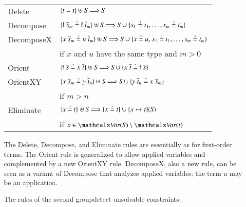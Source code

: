 \jot
\noindent
\begin{tabular}{ll}
  \textsf{Delete} & $\{ t \unif t \} \uplus \mathit{S} \Unifarrow \mathit{S}$ \\[\jot]
  \textsf{Decompose} & $\{ \cst{f} \; \tuple{s}{m} \unif \cst{f} \; \tuple{t}{m} \} \uplus \mathit{S} \Unifarrow {} 
                        \mathit{S} \cup \{ s_1 \unif t_1, \ldots, s_m \unif t_m \}$ \\[\jot]
  \textsf{DecomposeX} & $\{ x \; \tuple{s}{{m}} \unif u \; \tuple{t}{{m}} \} \uplus \mathit{S} \Unifarrow {} 
                         \mathit{S} \cup \{ x \unif u{,}\; s_1 \unif t_1, \ldots, s_{m} \unif t_{m} \}$  \\
                      & if $x$ and $u$ have the same type and $m > 0$ \\[\jot]
  \textsf{Orient}     & $\{ \cst{f} \; \overline{s} \unif x \; \overline{t} \} \allowbreak \uplus \mathit{S}
                         \Unifarrow \mathit{S} \cup \{ x \; \overline{t} \unif \cst{f} \; \overline{s} \}$ \\[\jot]
  \textsf{OrientXY}   &  $\{ x \; \tuple{s}{m} \unif y \; \tuple{t}{n} \} \allowbreak \uplus \mathit{S}
                         \Unifarrow \mathit{S} \cup \{ y \; \tuple{t}{n} \unif x \; \tuple{s}{m} \}$  \\
                      &   if $m > n$ \\[\jot]
  \textsf{Eliminate}  & $\{ x \unif t \} \uplus \mathit{S} \Unifarrow \{ x \unif t \} \cup \{ x \mapsto t \}(\mathit{S})$ \\
                      &   if $x \in \Var(\mathit{S}) \setminus \Var(t)$
\end{tabular}
\jot

The \textsf{Delete}, \textsf{Decompose}, and \textsf{Eliminate} rules are
essentially as for first-order terms. The \textsf{Orient} rule is generalized
to allow applied variables and complemented by a new \textsf{Orient\-XY} rule.
\textsf{DecomposeX}, also a new rule, can be seen as a variant of
\textsf{Decompose} that analyzes applied variables; the term $u$ may be an
application.

The rules of the second groupdetect unsolvable constraints:
%

